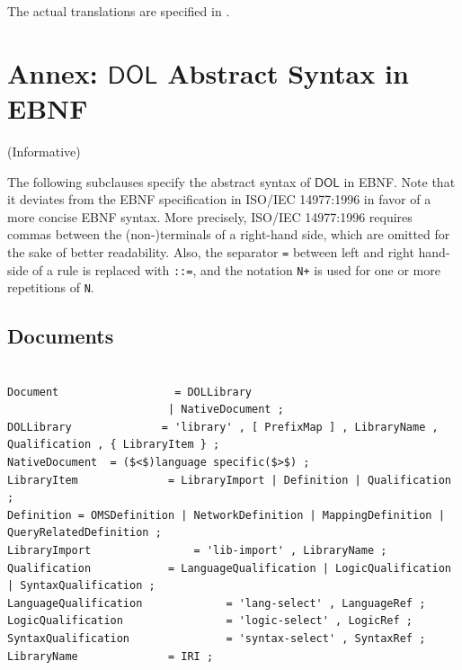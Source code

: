 \documentclass[10pt,fleqn,final]{scrreprt}
\makeatletter
\newcommand{\cbs}[0]{\color{red}\xspace} %
\newcommand{\cbe}[0]{\color{black}\xspace} %
\newcommand*\CommentAuthor{}
\renewcommand*\CommentAuthor{#1}}
\newcommand*\CommentDate{}
\renewcommand*\CommentDate{#1}}
\newcommand*\CommentId{}
\renewcommand*\CommentId{#1}}
\newcommand*\CommentType{}
\renewcommand*\CommentType{#1}}
\newcommand*{\SetCommentColorByType}[1]{%
\edef\localType{{#1}}%
\expandafter\ifstrequal\localType{q-aut}{\colorlet{CommentColor}{red}}{%
\expandafter\ifstrequal\localType{q-all}{\colorlet{CommentColor}{orange}}{%
\expandafter\ifstrequal\localType{todo}{\colorlet{CommentColor}{orange}}{%
\expandafter\ifstrequal\localType{fyi}{\colorlet{CommentColor}{lightgray}}{%
\colorlet{CommentColor}{yellow}}}}}}
\newcommand*{\SetCommentPrefixByType}[1]{%
\edef\localType{{#1}}%
\expandafter\@ifmtarg\localType{%
\edef\CommentPrefix{}%
}{%
\caseupper[q]{#1}%
\edef\CommentPrefix{\thestring: }%
}}
\newcommand*{\initComment}[1]{%
\setkeys{Comment}{#1}%
\SetCommentColorByType{\CommentType}%
\relax%
\SetCommentPrefixByType{\CommentType}%
\relax%
}
\newcommand*{\todonote}[2][]{%
\initComment{#1}%
\pdfcomment[author=\CommentAuthor,color=CommentColor,date=\CommentDate,id=\CommentId]{%
\CommentPrefix
#2}}
\renewcommand*{\todonote}[2][]{%
\initComment{#1}%
\ednote{\CommentPrefix #2}}
\newcommand*{\syntax}[1]{\texttt{#1}}
\newcommand*{\IS}{OMG Specification\xspace}
\newcommand*{\DOL}{\ensuremath{\mathsf{DOL}}\xspace}
\newcommand{\informative}[0]{{\begin{center}{\Large{(Informative})}\end{center}} \bigskip}
\newcommand{\sclause}[1]{\section{#1}}
\newcommand{\nisref}[1]{#1}
\newcommand{\infannex}[1]{ \chapter{Annex: #1}  \informative }
\newenvironment{definitions}[0]{\medskip }{}
\makeatother
\begin{document}
\begin{definitions}
The actual translations are specified in \cite{OntoGraph}.






\infannex{\DOL Abstract Syntax in EBNF}
\label{a:EBNF}

\cbs
The following subclauses specify the abstract syntax of \DOL in EBNF. Note that it deviates from the EBNF specification in
 \nisref{ISO/IEC 14977:1996} in favor of a more concise
EBNF syntax. More precisely, \nisref{ISO/IEC 14977:1996} requires commas between the (non-)terminals of a right-hand side, which are omitted 
for the sake of better readability. Also, the separator \syntax{=}
between left and right hand-side of a rule is replaced with \syntax{::=}, and 
 the notation \syntax{N+} is used 
for one or more repetitions of \syntax{N}.
\cbe

\sclause{Documents}\label{c:libraries}
\begin{lstlisting}[language=ebnf,escapeinside={()}]  % abstract syntax

Document                  = DOLLibrary
                         | NativeDocument ;
DOLLibrary              = 'library' , [ PrefixMap ] , LibraryName , Qualification , { LibraryItem } ;
NativeDocument  = ($<$)language specific($>$) ;
LibraryItem              = LibraryImport | Definition | Qualification ;
Definition = OMSDefinition | NetworkDefinition | MappingDefinition | QueryRelatedDefinition ;
LibraryImport                = 'lib-import' , LibraryName ;
Qualification            = LanguageQualification | LogicQualification | SyntaxQualification ;
LanguageQualification             = 'lang-select' , LanguageRef ;
LogicQualification                = 'logic-select' , LogicRef ;
SyntaxQualification               = 'syntax-select' , SyntaxRef ;
LibraryName              = IRI ;


\end{lstlisting}
\end{definitions}
\end{document}
